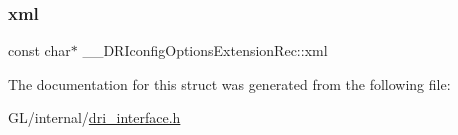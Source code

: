\subsubsection{\texorpdfstring{xml}{xml}}
{\footnotesize\ttfamily const char$\ast$ \+\_\+\+\_\+\+D\+R\+Iconfig\+Options\+Extension\+Rec\+::xml}



The documentation for this struct was generated from the following file\+:\begin{DoxyCompactItemize}
\item 
G\+L/internal/\hyperlink{dri__interface_8h}{dri\+\_\+interface.\+h}\end{DoxyCompactItemize}

